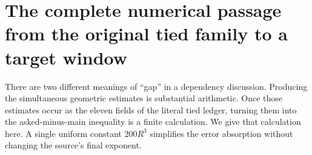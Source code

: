 \section{The complete numerical passage from the original tied family to a target window}
\label{sec:tied-window-completion}


There are two different meanings of ``gap'' in a dependency discussion.
Producing the simultaneous geometric estimates is substantial arithmetic.
Once those estimates occur as the eleven fields of the literal tied
ledger, turning them into the asked-minus-main inequality is a finite
calculation.  We give that calculation here.  A single uniform constant $200R^3$ simplifies the error absorption
without changing the source's final exponent.

